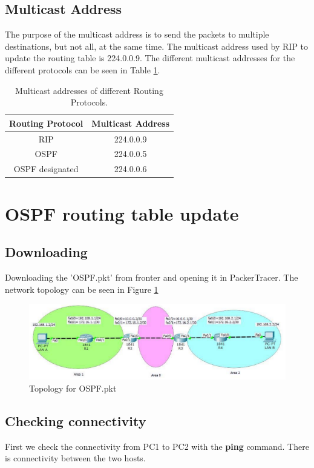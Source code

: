 \documentclass{article}
\begin{document}
\subsection{Multicast Address}
The purpose of the multicast address is to send the packets to multiple destinations, but not all, at the same time. The multicast address used by RIP to update the routing table is 224.0.0.9.
The different multicast addresses for the different protocols can be seen in Table \ref{tab:2muladd}. 
\begin{table}[h]
    \centering
    \begin{tabular}{|c|c|}
         \hline 
         Routing Protocol & Multicast Address  \\
         \hline 
         RIP & 224.0.0.9 \\
         OSPF & 224.0.0.5\\
         OSPF designated & 224.0.0.6\\
    \end{tabular}
    \caption{Multicast addresses of different Routing Protocols.}
    \label{tab:2muladd}
\end{table}

\section{OSPF routing table update}

\subsection{Downloading}
Downloading the 'OSPF.pkt' from fronter and opening it in PackerTracer. The network topology can be seen in Figure \ref{fig:3topo}


\begin{figure}[h]
    \centering
    \includegraphics[width=\textwidth]{3topo}
    \caption{Topology for OSPF.pkt}
    \label{fig:3topo}
\end{figure}


\subsection{Checking connectivity}
First we check the connectivity from PC1 to PC2 with the \textbf{ping} command. There is  connectivity between the two hosts.
\end{document}
